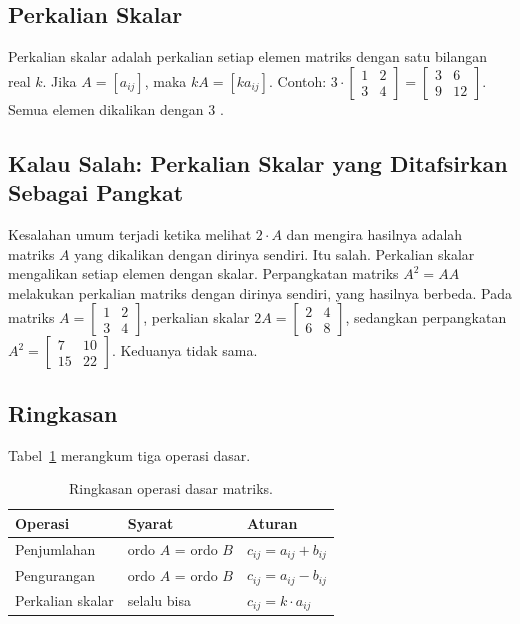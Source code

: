 \documentclass[11pt,a4paper]{article}
\begin{document}
\subsection{Perkalian Skalar}

Perkalian skalar adalah perkalian setiap elemen matriks dengan satu bilangan real $k$. Jika $A=[a_{ij}]$, maka $kA=[ka_{ij}]$. Contoh: $3 \cdot \begin{bmatrix}1&2\\3&4\end{bmatrix}=\begin{bmatrix}3&6\\9&12\end{bmatrix}$. Semua elemen dikalikan dengan 3 \cite{anton}.

\subsection{Kalau Salah: Perkalian Skalar yang Ditafsirkan Sebagai Pangkat}

Kesalahan umum terjadi ketika melihat $2 \cdot A$ dan mengira hasilnya adalah matriks $A$ yang dikalikan dengan dirinya sendiri. Itu salah. Perkalian skalar mengalikan setiap elemen dengan skalar. Perpangkatan matriks $A^2=AA$ melakukan perkalian matriks dengan dirinya sendiri, yang hasilnya berbeda. Pada matriks $A=\begin{bmatrix}1&2\\3&4\end{bmatrix}$, perkalian skalar $2A=\begin{bmatrix}2&4\\6&8\end{bmatrix}$, sedangkan perpangkatan $A^2=\begin{bmatrix}7&10\\15&22\end{bmatrix}$. Keduanya tidak sama.

\subsection{Ringkasan}

Tabel~\ref{tab:operasi-dasar} merangkum tiga operasi dasar.

\begin{table}[H]
	\centering
	\caption{Ringkasan operasi dasar matriks.}
	\label{tab:operasi-dasar}
	\small
	\begin{tabularx}{\textwidth}{l X X}
		\toprule
		Operasi          & Syarat              & Aturan                  \\
		\midrule
		Penjumlahan      & ordo $A$ = ordo $B$ & $c_{ij}=a_{ij}+b_{ij}$  \\
		Pengurangan      & ordo $A$ = ordo $B$ & $c_{ij}=a_{ij}-b_{ij}$  \\
		Perkalian skalar & selalu bisa         & $c_{ij}=k \cdot a_{ij}$ \\
		\bottomrule
	\end{tabularx}
\end{table}
\end{document}
